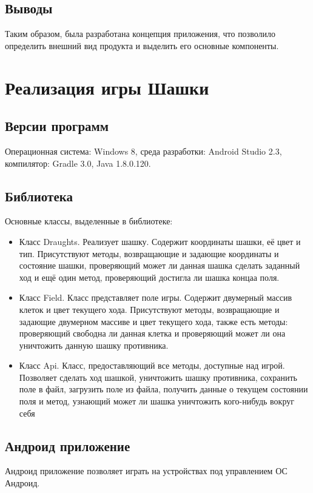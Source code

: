 \documentclass[a4paper]{article}
\begin{document}
\subsection{Выводы}
Таким образом, была разработана концепция приложения, что позволило определить внешний вид продукта и выделить его основные компоненты.

\section{Реализация игры Шашки}
\subsection{Версии программ}
Операционная система: Windows 8, среда разработки: Android Studio 2.3, компилятор: Gradle 3.0, Java 1.8.0.120.

\subsection{Библиотека}
\noindent Основные классы, выделенные в библиотеке:
\begin{itemize}
\item Класс Draughts. Реализует шашку. Содержит координаты шашки, её цвет и тип. Присутствуют методы, возвращающие и задающие координаты и состояние шашки, проверяющий может ли данная шашка сделать заданный ход и ещё один метод, проверяющий достигла ли шашка концаа поля.
\item Класс Field. Класс представляет поле игры. Содержит двумерный массив клеток и цвет текущего хода. Присутствуют методы, возвращающие и задающие двумерном массиве и цвет текущего хода, также есть методы: проверяющий свободна ли данная клетка и проверяющий  может ли она уничтожить данную шашку противника.	
\item Класс Api. Класс, предоставляющий все методы, доступные над игрой. Позволяет сделать ход шашкой, уничтожить шашку противника, сохранить поле в файл, загрузить поле из файла, получить данные о текущем состоянии поля и метод, узнающий может ли шашка уничтожить кого-нибудь вокруг себя
\end{itemize}

\subsection{Андроид приложение}
Андроид приложение позволяет играть на устройствах под управлением ОС Андроид.
\end{document}
